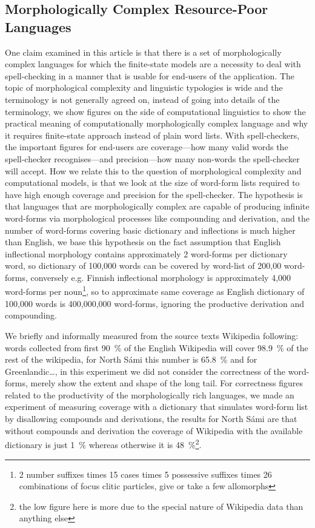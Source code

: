\documentclass[a4paper,12pt]{article}
\begin{document}
\subsection{Morphologically Complex Resource-Poor Languages}
\label{subsec:morphologically-complex}

One claim examined in this article is that there is a set of morphologically
complex languages for which the finite-state models are a necessity to deal
with spell-checking in a manner that is usable for end-users of the
application.  The topic of morphological complexity and linguistic typologies
is wide and the terminology is not generally agreed on, instead of going into
details of the terminology, we show figures on the side of computational
linguistics to show the practical meaning of computationally morphologically
complex language and why it requires finite-state approach instead of plain
word lists. With spell-checkers, the important figures for end-users are
coverage---how many valid words the spell-checker recognises---and
precision---how many non-words the spell-checker will accept. How we relate
this to the question of morphological complexity and computational models, is
that we look at the size of word-form lists required to have high enough
coverage and precision for the spell-checker. The hypothesis is that languages
that are morphologically complex are capable of producing infinite word-forms
via morphological processes like compounding and derivation, and the number of
word-forms covering basic dictionary and inflections is much higher than
English, we base this hypothesis on the fact assumption that English
inflectional morphology contains approximately 2 word-forms per dictionary
word, so dictionary of 100,000 words can be covered by word-list of 200,00
word-forms, conversely e.g. Finnish inflectional morphology is approximately
4,000 word-forms per noun\footnote{2 number suffixes times 15 cases times 5
    possessive suffixes times 26 combinations of focus clitic particles, give
or take a few allomorphs}, so to approximate same coverage as English
dictionary of 100,000 words is 400,000,000 word-forms, ignoring the productive
derivation and compounding.

We briefly and informally measured from the source texts Wikipedia following:
words collected from first 90~\% of the English Wikipedia will cover 98.9~\%
of the rest of the wikipedia, for North Sámi this number is 65.8~\% and for
Greenlandic\ldots, in this experiment we did not consider the correctness
of the word-forms, merely show the extent and shape of the long tail. For
correctness figures related to the productivity of the morphologically
rich languages, we made an experiment of measuring coverage with a dictionary
that simulates word-form list by disallowing compounds and derivations, the
results for North Sámi are that without compounds and derivation the
coverage of Wikipedia with the available dictionary is just 1~\% whereas
otherwise it is 48~\%\footnote{the low figure here is more due to the special
nature of Wikipedia data than anything else}.
\end{document}
